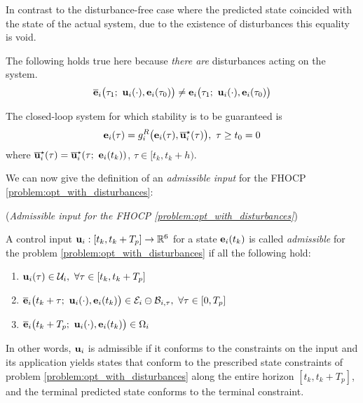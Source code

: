 In contrast to the disturbance-free case where the predicted state coincided
with the state of the actual system, due to the existence of disturbances
this equality is void.

\begin{bw_box}
\begin{remark}
  The following holds true here because \textit{there are} disturbances
  acting on the system.
  \begin{align}
    \overline{\bm{\mathbf{e}}}_i\big(\tau_1;\ \bm{\mathbf{u}}_i(\cdot), \bm{\mathbf{e}}_i(\tau_0)\big) \not=
    \bm{\mathbf{e}}_i\big(\tau_1;\ \bm{\mathbf{u}}_i(\cdot), \bm{\mathbf{e}}_i(\tau_0)\big)
    \label{eq:error_now_to_predicted_error_2}
  \end{align}
\end{remark}
\end{bw_box}

The closed-loop system for which stability is to be guaranteed is
\begin{align}
  \bm{\mathbf{e}}_i(\tau) = g_i^R\big(\bm{\mathbf{e}}_i(\tau), \overline{\bm{\mathbf{u}}}_i^{\star}(\tau)\big),\ \tau \geq t_0 = 0
  \label{eq:with_disturbances_closed_loop}
\end{align}
where $\overline{\bm{\mathbf{u}}}_i^{\star}(\tau) = \overline{\bm{\mathbf{u}}}_i^{\star}(\tau;\ \bm{\mathbf{e}}_i(t_k))$,
$\tau \in [t_k, t_k + h)$.

We can now give the definition of an \textit{admissible input} for the FHOCP
\eqref{problem:opt_with_disturbances}:

\begin{bw_box}
  \begin{definition} (\textit{Admissible input for the FHOCP
    \eqref{problem:opt_with_disturbances}})
  \label{definition:admissible_input_with_disturbance}

  A control input $\bm{\mathbf{u}}_i : [t_k, t_k + T_p] \to \mathbb{R}^6$ for a state
  $\bm{\mathbf{e}}_i(t_k)$ is called \textit{admissible} for the problem
  \eqref{problem:opt_with_disturbances} if all the following hold:

  \begin{enumerate}
    \item $\vect{u}_i(\tau) \in \mathcal{U}_i,\ \forall \tau \in [t_k, t_k + T_p]$
    \item $\overline{\vect{e}}_i\big(t_k + \tau;\ \vect{u}_i(\cdot), \vect{e}_i(t_k)\big) \in \mathcal{E}_i \ominus \mathcal{B}_{i,\tau},\ \forall \tau \in [0, T_p]$
    \item $\overline{\vect{e}}_i\big(t_k + T_p;\ \vect{u}_i(\cdot), \vect{e}_i(t_k)\big) \in \Omega_i$
  \end{enumerate}

  In other words, $\bm{\mathbf{u}}_i$ is admissible if it conforms to the constraints
  on the input and its application yields states that conform to the
  prescribed state constraints of problem \eqref{problem:opt_with_disturbances}
  along the entire horizon $[t_k, t_k + T_p]$, and the terminal predicted
  state conforms to the terminal constraint.

\end{definition}
\end{bw_box}
